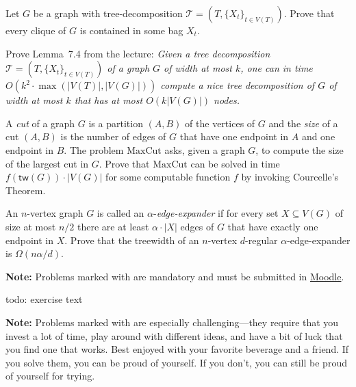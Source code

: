 \documentclass{uebung_cs}
\begin{document}
\begin{exercise}
Let $G$ be a graph with tree-decomposition $\mathcal{T}=(T,\{X_t\}_{t\in V(T)})$. Prove that every clique of $G$ is contained in some bag $X_t$.
\end{exercise}

\begin{exercise}
Prove Lemma~7.4 from the lecture:\newline
\noindent \textit{Given a tree decomposition $\mathcal{T}=(T,\{X_t\}_{t\in V(T)})$ of a graph $G$ of width at most $k$, one can in time $O(k^2\cdot \max(|V(T)|,|V(G)|))$ compute a nice tree decomposition of $G$ of width at most $k$ that has at most $O(k|V(G)|)$ nodes.
}
\end{exercise}

\begin{exercise}
A \emph{cut} of a graph $G$ is a partition $(A,B)$ of the vertices of $G$ and the \emph{size} of a cut $(A,B)$ is the number of edges of $G$ that have one endpoint in $A$ and one endpoint in $B$. The problem $\mathrm{MaxCut}$ asks, given a graph $G$, to compute the size of the largest cut in $G$. Prove that $\mathrm{MaxCut}$ can be solved in time $f(\mathsf{tw}(G)) \cdot |V(G)|$ for some computable function $f$ by invoking Courcelle's Theorem.
\end{exercise}


\begin{exercise}
An $n$-vertex graph $G$ is called an $\alpha$-\emph{edge-expander} if for every set $X \subseteq V(G)$ of size at most $n/2$ there are at least $\alpha\cdot |X|$ edges of $G$ that have exactly one endpoint in $X$. Prove that the treewidth of an $n$-vertex $d$-regular $\alpha$-edge-expander is $\Omega(n\alpha/d)$.
\end{exercise}


\textbf{Note:} Problems marked with \mandatory are mandatory and must be submitted in \href{https://moodle.studiumdigitale.uni-frankfurt.de/moodle/course/view.php?id=6259}{Moodle}.

\begin{exercise}
  todo: exercise text
\end{exercise}

\textbf{Note:} Problems marked with \hard are especially challenging---they require that you invest a lot of time, play around with different ideas, and have a bit of luck that you find one that works. Best enjoyed with your favorite beverage and a friend. If you solve them, you can be proud of yourself. If you don't, you can still be proud of yourself for trying.
\end{document}
